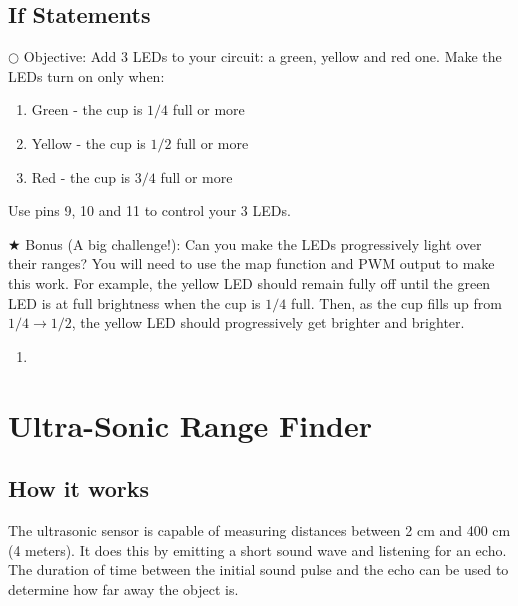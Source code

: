 \documentclass[12pt]{article}
\begin{document}
\subsection{If Statements}


\noindent $\bigcirc$ Objective: Add 3 LEDs to your circuit: a green, yellow and red one. Make the LEDs turn on only when:
\begin{enumerate}
	\itemsep -1em
	\item Green - the cup is $1/4$ full or more
	\item Yellow - the cup is $1/2$ full or more
	\item Red - the cup is $3/4$ full or more
\end{enumerate}

\noindent Use pins 9, 10 and 11 to control your 3 LEDs.

\noindent $\bigstar$ Bonus (A big challenge!): Can you make the LEDs progressively light over their ranges? You will need to use the map function and PWM output to make this work. For example, the yellow LED should remain fully off until the green LED is at full brightness when the cup is $1/4$ full. Then, as the cup fills up from $1/4 \rightarrow 1/2$, the yellow LED should progressively get brighter and brighter.

\begin{enumerate}
	\item 
\end{enumerate}




















\section{Ultra-Sonic Range Finder}

\subsection{How it works}

The ultrasonic sensor is capable of measuring distances between 2 cm and 400 cm (4 meters). It does this by emitting a short sound wave and listening for an echo. The duration of time between the initial sound pulse and the echo can be used to determine how far away the object is.
\end{document}

